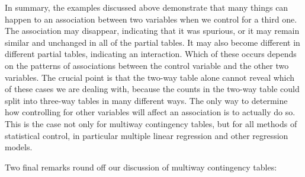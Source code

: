 \documentclass[11pt,a4paper,openany]{book}
\begin{document}
In summary, the examples discussed above demonstrate that many things
can happen to an association between two variables when we control for a
third one. The association may disappear, indicating that it was
spurious, or it may remain similar and unchanged in all of the partial
tables. It may also become different in different partial tables,
indicating an interaction. Which of these occurs depends on the patterns
of associations between the control variable and the other two
variables. The crucial point is that the two-way table alone cannot
reveal which of these cases we are dealing with, because the counts in
the two-way table could split into three-way tables in many different
ways. The only way to determine how controlling for other variables will
affect an association is to actually do so. This is the case not only
for multiway contingency tables, but for all methods of statistical
control, in particular multiple linear regression and other regression
models.

Two final remarks round off our discussion of multiway contingency
tables:
\end{document}

